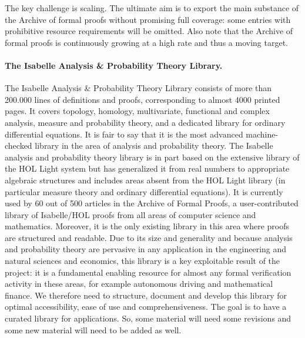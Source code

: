 The key challenge is scaling. The ultimate aim is to export the main
substance of the Archive of formal proofs without promising full coverage: some entries
with prohibitive resource requirements will be omitted. Also note that
the Archive of formal proofs is continuously growing at a high rate and thus a moving
target.

\paragraph*{The Isabelle Analysis \& Probability Theory Library.}
The Isabelle Analysis \& Probability Theory Library consists of more
than 200.000 lines of definitions and proofs, corresponding to almost
4000 printed pages. It covers topology, homology, multivariate,
functional and complex analysis, measure and probability theory, and a
dedicated library for ordinary differential equations. It is fair to
say that it is the most advanced machine-checked library in the area
of analysis and probability theory. The Isabelle analysis and
probability theory library is in part based on the extensive library
of the HOL Light system but has generalized it from real numbers to
appropriate algebraic structures and includes areas absent from the
HOL Light library (in particular measure theory and ordinary
differential equations). It is currently used by 60 out of 500
articles in the Archive of Formal Proofs, a user-contributed library
of Isabelle/HOL proofs from all areas of computer science and
mathematics. Moreover, it is the only existing library in this area
where proofs are structured and readable. Due to its size and
generality and because analysis and probability theory are pervasive
in any application in the engineering and natural sciences and
economics, this library is a key exploitable result of the project: it
is a fundamental enabling resource for almost any formal verification
activity in these areas, for example autonomous driving and
mathematical finance. We therefore need to structure,
document and develop this library for optimal accessibility, ease of
use and comprehensiveness. The goal is to have a curated library for
applications. So, some material will need some revisions
and some new material will need to be added as well.

